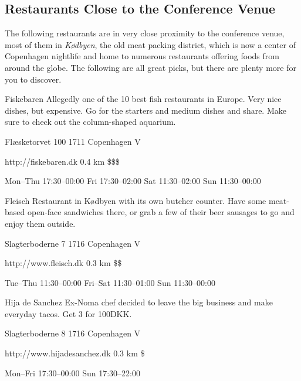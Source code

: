 \begin{left}
\begin{eventitem}
\begin{eventitem}
\begin{eventitem}
\section{Restaurants Close to the Conference Venue}
The following restaurants are in very close proximity to the conference venue, most of them in \emph{Kødbyen}, the old meat packing district, which is now a center of Copenhagen nightlife and home to numerous restaurants offering foods from around the globe. The following are all great picks, but there are plenty more for you to discover.
\par
\bigskip
\begin{fooditem}
{Fiskebaren}
{Allegedly one of the 10 best fish restaurants in Europe. Very nice dishes, but expensive. Go for the starters and medium dishes and share. Make sure to check out the column-shaped aquarium.}
{\begin{addr}
{Flæsketorvet 100}
{1711 Copenhagen V}
\end{addr}}
{http://fiskebaren.dk}
{0.4 km}
{\$\$\$}
{\begin{ohours}
{Mon–Thu}
{17:30–00:00}
{Fri}
{17:30–02:00}
{Sat}
{11:30–02:00}
{Sun}
{11:30–00:00}
\end{ohours}}
\end{fooditem}
\begin{fooditem}
{Fleisch}
{Restaurant in Kødbyen with its own butcher counter. Have some meat-based open-face sandwiches there, or grab a few of their beer sausages to go and enjoy them outside.}
{\begin{addr}
{Slagterboderne 7}
{1716 Copenhagen V}
\end{addr}}
{http://www.fleisch.dk}
{0.3 km}
{\$\$}
{\begin{ohours}
{Tue–Thu}
{11:30–00:00}
{Fri–Sat}
{ 11:30–01:00}
{Sun}
{11:30–00:00}
{}
{}
\end{ohours}}
\end{fooditem}
\begin{fooditem}
{Hija de Sanchez}
{Ex-Noma chef decided to leave the big business and make everyday tacos. Get 3 for 100DKK.}
{\begin{addr}
{Slagterboderne 8}
{1716 Copenhagen V}
\end{addr}}
{http://www.hijadesanchez.dk}
{0.3 km}
{\$}
{\begin{ohours}
{Mon–Fri}
{17:30–00:00}
{Sun}
{17:30–22:00}
{}
{}
{}
{}
\end{ohours}}
\end{fooditem}
\begin{fooditemwourl}

\end{fooditemwourl}
\end{eventitem}
\end{eventitem}
\end{eventitem}
\end{left}

